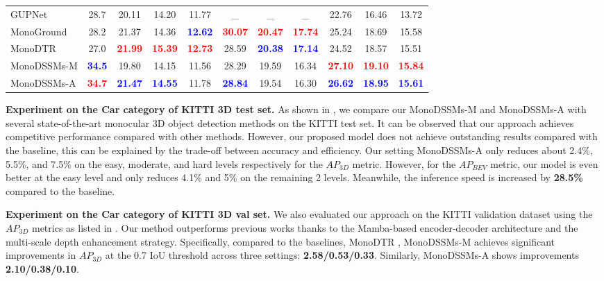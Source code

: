 \begin{table}[tb]
{\begin{tabular}{l|c|ccc|ccc|ccc}
        GUPNet~\cite{GUPNet} & 28.7 & 20.11 & 14.20 & 11.77 & \_ & \_ & \_ & 22.76 & 16.46 & 13.72\\
        MonoGround~\cite{MonoGround} & 28.2 & 21.37 & 14.36 & \textbf{\textcolor{blue}{12.62}} &  \textbf{\textcolor{red}{30.07}} & \textbf{\textcolor{red}{20.47}} &  \textbf{\textcolor{red}{17.74}} & 25.24 &  18.69 &  15.58\\
        MonoDTR~\cite{MonoDTR} & 27.0 & \textbf{\textcolor{red}{21.99}} & \textbf{\textcolor{red}{15.39}} &  \textbf{\textcolor{red}{12.73}} & 28.59 & \textbf{\textcolor{blue}{20.38}} & \textbf{\textcolor{blue}{17.14}} & 24.52 &  18.57 & 15.51\\
        \hline\hline
        MonoDSSMs-M& \textbf{\textcolor{blue}{34.5}} & 19.80 & 14.15 & 11.56 & 28.29 & 19.59 & 16.34 & \textbf{\textcolor{red}{27.10}} & \textbf{\textcolor{red}{19.10}} & \textbf{\textcolor{red}{15.84}}\\
        MonoDSSMs-A & \textbf{\textcolor{red}{34.7}} & \textbf{\textcolor{blue}{21.47}} & \textbf{\textcolor{blue}{14.55}} & 11.78 & \textbf{\textcolor{blue}{28.84}} & 19.54 & 16.30 & \textbf{\textcolor{blue}{26.62}} & \textbf{\textcolor{blue}{18.95}} & \textbf{\textcolor{blue}{15.61}}\\
    \end{tabular}}
\end{table}
\textbf{Experiment on the Car category of KITTI 3D test set.} As shown in , we compare our MonoDSSMs-M and MonoDSSMs-A with several state-of-the-art monocular 3D object detection methods on the KITTI test set. It can be observed that our approach achieves competitive performance compared with other methods. However, our proposed model does not achieve outstanding results compared with the baseline, this can be explained by the trade-off between accuracy and efficiency. Our setting MonoDSSMs-A only reduces about 2.4\%, 5.5\%, and 7.5\% on the easy, moderate, and hard levels respectively for the $AP_{3D}$ metric. However, for the $AP_{BEV}$ metric, our model is even better at the easy level and only reduces 4.1\% and 5\% on the remaining 2 levels. Meanwhile, the inference speed is increased by \textbf{28.5\%} compared to the baseline.

\noindent\textbf{Experiment on the Car category of KITTI 3D val set.} We also evaluated our approach on the KITTI validation dataset using the $AP_{3D}$ metrics as listed in . Our method outperforms previous works thanks to the Mamba-based encoder-decoder architecture and the multi-scale depth enhancement strategy. Specifically, compared to the baselines, MonoDTR \cite{MonoDTR}, MonoDSSMs-M achieves significant improvements in $AP_{3D}$ at the 0.7 IoU threshold across three settings: \textbf{2.58\slash0.53\slash0.33}. Similarly, MonoDSSMs-A shows improvements \textbf{2.10\slash0.38\slash0.10}.

